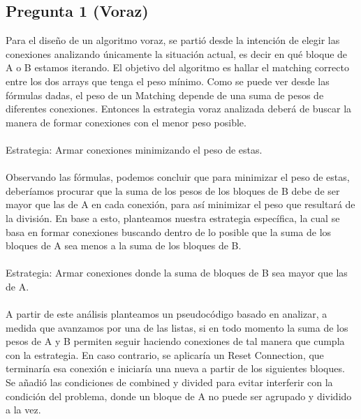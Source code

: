 \documentclass{article}
\begin{document}
	\subsection*{Pregunta 1 (Voraz)} 
	Para el diseño de un algoritmo voraz, se partió desde la intención de elegir las conexiones analizando únicamente la situación actual, es decir en qué bloque de A o B estamos iterando. El objetivo del algoritmo es hallar el matching correcto entre los dos arrays que tenga el peso mínimo. Como se puede ver desde las fórmulas dadas, el peso de un Matching depende de una suma de pesos de diferentes conexiones. Entonces la estrategia voraz analizada deberá de buscar la manera de formar conexiones con el menor peso posible.
	\\\\Estrategia: Armar conexiones minimizando el peso de estas.
	\\\\Observando las fórmulas, podemos concluir que para minimizar el peso de estas, deberíamos procurar que la suma de los pesos de los bloques de B debe de ser mayor que las de A en cada conexión, para así minimizar el peso que resultará de la división. En base a esto, planteamos nuestra estrategia específica, la cual se basa en formar conexiones buscando dentro de lo posible que la suma de los bloques de A sea menos a la suma de los bloques de B.\\\\ Estrategia: Armar conexiones donde la suma de bloques de B sea mayor que las de A.\\\\
	A partir de este análisis planteamos un pseudocódigo basado en analizar, a medida que avanzamos por una de las listas, si en todo momento la suma de los pesos de A y B permiten seguir haciendo conexiones de tal manera que cumpla con la estrategia. En caso contrario, se aplicaría un Reset Connection, que terminaría esa conexión e iniciaría una nueva a partir de los siguientes bloques. Se añadió las condiciones de combined y divided para evitar interferir con la condición del problema, donde un bloque de A no puede ser agrupado y dividido a la vez.
	
\end{document}
